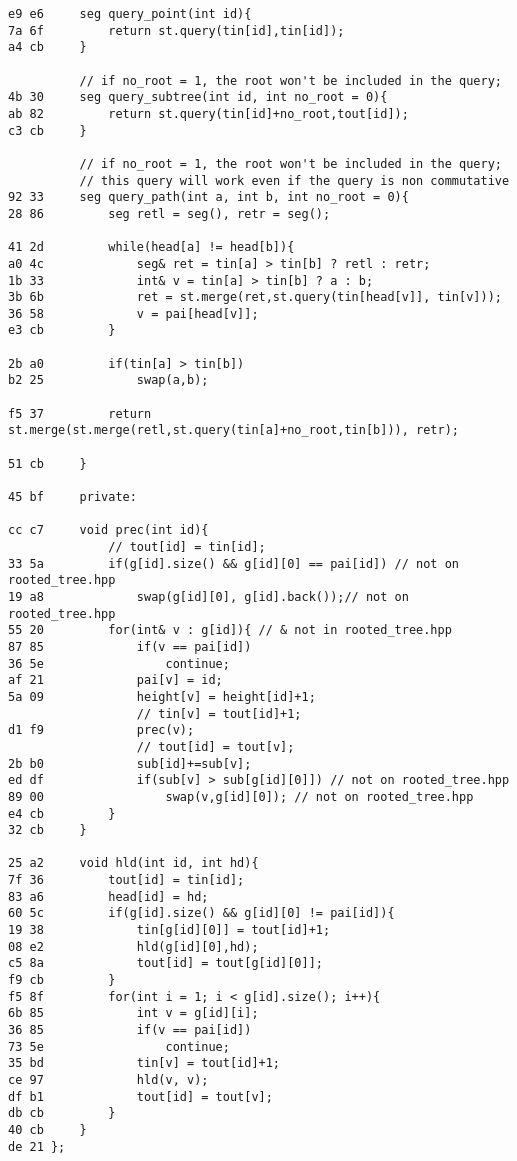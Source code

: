 \documentclass[11pt, a4paper, twoside]{article}
\begin{document}
\begin{lstlisting}
e9 e6     seg query_point(int id){
7a 6f         return st.query(tin[id],tin[id]);
a4 cb     }
      
          // if no_root = 1, the root won't be included in the query;
4b 30     seg query_subtree(int id, int no_root = 0){
ab 82         return st.query(tin[id]+no_root,tout[id]);
c3 cb     }
          
          // if no_root = 1, the root won't be included in the query;
          // this query will work even if the query is non commutative
92 33     seg query_path(int a, int b, int no_root = 0){
28 86         seg retl = seg(), retr = seg();
      
41 2d         while(head[a] != head[b]){
a0 4c             seg& ret = tin[a] > tin[b] ? retl : retr;
1b 33             int& v = tin[a] > tin[b] ? a : b;
3b 6b             ret = st.merge(ret,st.query(tin[head[v]], tin[v]));
36 58             v = pai[head[v]];
e3 cb         }
      
2b a0         if(tin[a] > tin[b])
b2 25             swap(a,b);
      
f5 37         return st.merge(st.merge(retl,st.query(tin[a]+no_root,tin[b])), retr);
      
51 cb     }
      
45 bf     private:
          
cc c7     void prec(int id){
              // tout[id] = tin[id];
33 5a         if(g[id].size() && g[id][0] == pai[id]) // not on rooted_tree.hpp
19 a8             swap(g[id][0], g[id].back());// not on rooted_tree.hpp
55 20         for(int& v : g[id]){ // & not in rooted_tree.hpp
87 85             if(v == pai[id])
36 5e                 continue;
af 21             pai[v] = id;
5a 09             height[v] = height[id]+1;
                  // tin[v] = tout[id]+1;
d1 f9             prec(v);
                  // tout[id] = tout[v];
2b b0             sub[id]+=sub[v];
ed df             if(sub[v] > sub[g[id][0]]) // not on rooted_tree.hpp
89 00                 swap(v,g[id][0]); // not on rooted_tree.hpp
e4 cb         }
32 cb     }
      
25 a2     void hld(int id, int hd){
7f 36         tout[id] = tin[id];
83 a6         head[id] = hd;
60 5c         if(g[id].size() && g[id][0] != pai[id]){
19 38             tin[g[id][0]] = tout[id]+1;
08 e2             hld(g[id][0],hd);
c5 8a             tout[id] = tout[g[id][0]];
f9 cb         }
f5 8f         for(int i = 1; i < g[id].size(); i++){
6b 85             int v = g[id][i];
36 85             if(v == pai[id])
73 5e                 continue;
35 bd             tin[v] = tout[id]+1;
ce 97             hld(v, v);
df b1             tout[id] = tout[v];
db cb         }
40 cb     }
de 21 };
\end{lstlisting}
\end{document}
